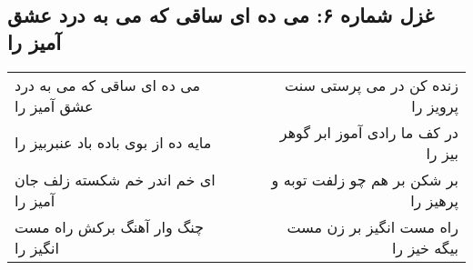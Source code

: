 \begin{center}
\section*{غزل شماره ۶: می ده ای ساقی که می به درد عشق آمیز را}
\label{sec:006}
\begin{longtable}{l p{0.5cm} r}
می ده ای ساقی که می به درد عشق آمیز را
&&
زنده کن در می پرستی سنت پرویز را
\\
مایه ده از بوی باده باد عنبربیز را
&&
در کف ما رادی آموز ابر گوهر بیز را
\\
ای خم اندر خم شکسته زلف جان آمیز را
&&
بر شکن بر هم چو زلفت توبه و پرهیز را
\\
چنگ وار آهنگ برکش راه مست انگیز را
&&
راه مست انگیز بر زن مست بیگه خیز را
\\
\end{longtable}
\end{center}
